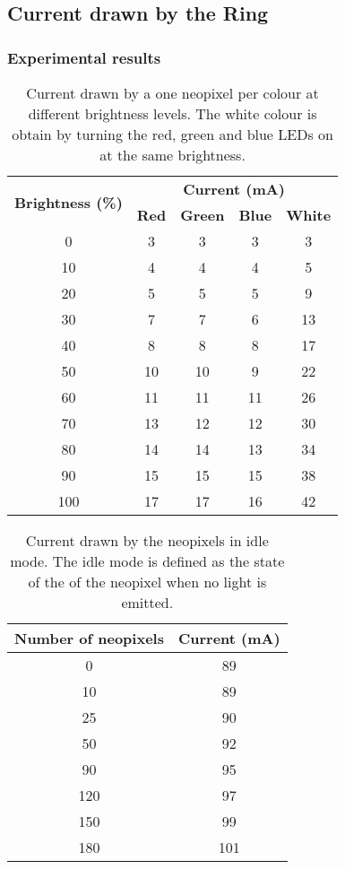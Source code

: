 \subsection{Current drawn by the Ring}
\subsubsection{Experimental results}

\begin{table}[h!]
	\centering
	\caption{Current drawn by a one neopixel per colour at different brightness levels. The white colour is obtain by turning the red, green and blue LEDs on at the same brightness.}
	\label{table:current_one_pixel}
	\begin{tabular}{ccccc}
		\hline
		\hline
		\toprule
		\multirow{2}{*}{\textbf{Brightness (\%)}} & \multicolumn{4}{c}{\textbf{Current (mA)}}\\
		& \textbf{Red} & \textbf{Green} & \textbf{Blue} & \textbf{White} \\
		\bottomrule
		\toprule
		0	&	3	&	3	&	3	&	3	\\
		10	&	4	&	4	&	4	&	5	\\
		20	&	5	&	5	&	5	&	9	\\
		30	&	7	&	7	&	6	&	13	\\
		40	&	8	&	8	&	8	&	17	\\
		50	&	10	&	10	&	9	&	22	\\
		60	&	11	&	11	&	11	&	26	\\
		70	&	13	&	12	&	12	&	30	\\
		80	&	14	&	14	&	13	&	34	\\
		90	&	15	&	15	&	15	&	38	\\
		100	&	17	&	17	&	16	&	42	\\
		\bottomrule
		\hline
		\hline
	\end{tabular}
\end{table}

\begin{table}[h!]
	\centering
	\caption{Current drawn by the neopixels in idle mode. The idle mode is defined as the state of the of the neopixel when no light is emitted.}
	\label{table:current_idle}
	\begin{tabular}{cc}
		\hline
		\hline
		\toprule
		\textbf{Number of neopixels} & \textbf{Current (mA)}\\
		\bottomrule
		\toprule
		0	&	89	\\
		10	&	89	\\
		25	&	90	\\
		50	&	92	\\
		90	&	95	\\
		120	&	97	\\
		150	&	99	\\
		180	&	101	\\
		\bottomrule
		\hline
		\hline
	\end{tabular}
\end{table}


